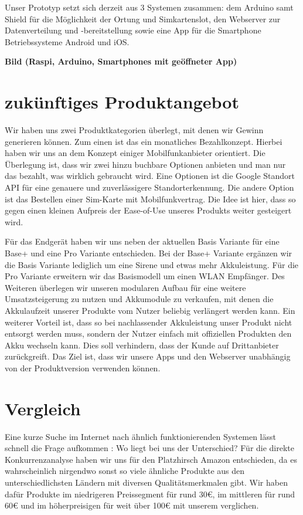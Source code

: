 Unser Prototyp setzt sich derzeit aus 3 Systemen zusammen: dem Arduino samt Shield für die Möglichkeit der Ortung und Simkartenslot, den Webserver zur Datenverteilung und -bereitstellung sowie eine App für die Smartphone Betriebssysteme Android und iOS.

\textbf{Bild (Raspi, Arduino, Smartphones mit geöffneter App)}

\section{zukünftiges Produktangebot}
Wir haben uns zwei Produktkategorien überlegt, mit denen wir Gewinn generieren können. Zum einen ist das ein monatliches Bezahlkonzept. Hierbei haben wir uns an dem Konzept einiger Mobilfunkanbieter orientiert. Die Überlegung ist, dass wir zwei hinzu buchbare Optionen anbieten und man nur das bezahlt, was wirklich gebraucht wird. Eine Optionen ist die Google Standort API für eine genauere und zuverlässigere Standorterkennung. Die andere Option ist das Bestellen einer Sim-Karte mit Mobilfunkvertrag. Die Idee ist hier, dass so gegen einen kleinen Aufpreis der Ease-of-Use unseres Produkts weiter gesteigert wird.

Für das Endgerät haben wir uns neben der aktuellen Basis Variante für eine Base+ und eine Pro Variante entschieden. Bei der Base+ Variante ergänzen wir die Basis Variante lediglich um eine Sirene und etwas mehr Akkuleistung. Für die Pro Variante erweitern wir das Basismodell um einen WLAN Empfänger. Des Weiteren überlegen wir unseren modularen Aufbau für eine weitere Umsatzsteigerung zu nutzen und Akkumodule zu verkaufen, mit denen die Akkulaufzeit unserer Produkte vom Nutzer beliebig verlängert werden kann. Ein weiterer Vorteil ist, dass so bei nachlassender Akkuleistung unser Produkt nicht entsorgt werden muss, sondern der Nutzer einfach mit offiziellen Produkten den Akku wechseln kann. Dies soll verhindern, dass der Kunde auf Drittanbieter zurückgreift.
Das Ziel ist, dass wir unsere Apps und den Webserver unabhängig von der Produktversion verwenden können.

\section{Vergleich} 
Eine kurze Suche im Internet nach ähnlich funktionierenden  Systemen lässt schnell die Frage aufkommen : 
Wo liegt bei uns der Unterschied?
Für die direkte Konkurrenzanalyse haben wir uns für den Platzhirsch Amazon entschieden, da es wahrscheinlich nirgendwo sonst so viele ähnliche Produkte aus den unterschiedlichsten Ländern mit diversen Qualitätsmerkmalen gibt. Wir haben dafür Produkte im niedrigeren  Preissegment für rund 30€, im mittleren für rund 60€ und im höherpreisigen für weit über 100€ mit unserem verglichen. 


